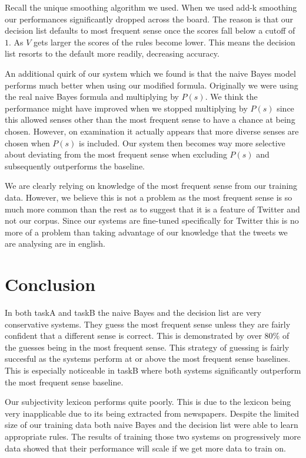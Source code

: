 \documentclass[11pt]{article}
\begin{document}
Recall the unique smoothing algorithm we used. When we used add-k smoothing our performances significantly dropped across the board. The reason is that our decision list defaults to most frequent sense once the scores fall below a cutoff of $1$. As $V$ gets larger the scores of the rules become lower. This means the decision list resorts to the default more readily, decreasing accuracy. 

An additional quirk of our system which we found is that the naive Bayes model performs much better when using our modified formula. Originally we were using the real naive Bayes formula and multiplying by $P(s)$. We think the performance might have improved when we stopped multiplying by $P(s)$ since this allowed senses other than the most frequent sense to have a chance at being chosen. However, on examination it actually appears that more diverse senses are chosen when $P(s)$ is included. Our system then becomes way more selective about deviating from the most frequent sense when excluding $P(s)$ and subsequently outperforms the baseline.

We are clearly relying on knowledge of the most frequent sense from our training data. However, we believe this is not a problem as the most frequent sense is so much more common than the rest as to suggest that it is a feature of Twitter and not our corpus. Since our systems are fine-tuned specifically for Twitter this is no more of a problem than taking advantage of our knowledge that the tweets we are analysing are in english.


\section{Conclusion}
In both taskA and taskB the naive Bayes and the decision list are very conservative systems. They guess the most frequent sense unless they are fairly confident that a different sense is correct. This is demonstrated by over $80\%$ of the guesses being in the most frequent sense. This strategy of guessing is fairly succesful as the systems perform at or above the most frequent sense baselines. This is especially noticeable in taskB where both systems significantly outperform the most frequent sense baseline. 

Our subjectivity lexicon performs quite poorly. This is due to the lexicon being very inapplicable due to its being extracted from newspapers. Despite the limited size of our training data both naive Bayes and the decision list were able to learn appropriate rules. The results of training those two systems on progressively more data showed that their performance will scale if we get more data to train on. 
\end{document}
